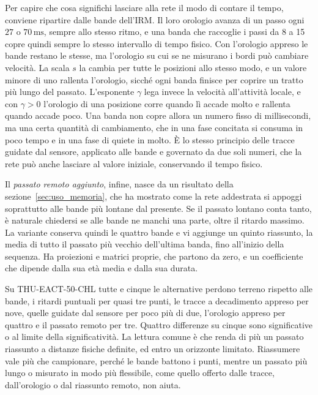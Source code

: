 Per capire che cosa significhi lasciare alla rete il modo di contare il tempo, conviene ripartire dalle bande dell'IRM. Il loro orologio avanza di un passo ogni $27$ o $70\,\mathrm{ms}$, sempre allo stesso ritmo, e una banda che raccoglie i passi da 8 a 15 copre quindi sempre lo stesso intervallo di tempo fisico. Con l'orologio appreso le bande restano le stesse, ma l'orologio su cui se ne misurano i bordi può cambiare velocità. La scala $s$ la cambia per tutte le posizioni allo stesso modo, e un valore minore di uno rallenta l'orologio, sicché ogni banda finisce per coprire un tratto più lungo del passato. L'esponente $\gamma$ lega invece la velocità all'attività locale, e con $\gamma>0$ l'orologio di una posizione corre quando lì accade molto e rallenta quando accade poco. Una banda non copre allora un numero fisso di millisecondi, ma una certa quantità di cambiamento, che in una fase concitata si consuma in poco tempo e in una fase di quiete in molto. È lo stesso principio delle tracce guidate dal sensore, applicato alle bande e governato da due soli numeri, che la rete può anche lasciare al valore iniziale, conservando il tempo fisico.

Il \emph{passato remoto aggiunto}, infine, nasce da un risultato della sezione~\ref{sec:uso_memoria}, che ha mostrato come la rete addestrata si appoggi soprattutto alle bande più lontane dal presente. Se il passato lontano conta tanto, è naturale chiedersi se alle bande ne manchi una parte, oltre il ritardo massimo. La variante conserva quindi le quattro bande e vi aggiunge un quinto riassunto, la media di tutto il passato più vecchio dell'ultima banda, fino all'inizio della sequenza. Ha proiezioni e matrici proprie, che partono da zero, e un coefficiente che dipende dalla sua età media e dalla sua durata.

\medskip
Su THU-EACT-50-CHL tutte e cinque le alternative perdono terreno rispetto alle bande, i ritardi puntuali per quasi tre punti, le tracce a decadimento appreso per nove, quelle guidate dal sensore per poco più di due, l'orologio appreso per quattro e il passato remoto per tre. Quattro differenze su cinque sono significative o al limite della significatività. La lettura comune è che renda di più un passato riassunto a distanze fisiche definite, ed entro un orizzonte limitato. Riassumere vale più che campionare, perché le bande battono i punti, mentre un passato più lungo o misurato in modo più flessibile, come quello offerto dalle tracce, dall'orologio o dal riassunto remoto, non aiuta.

